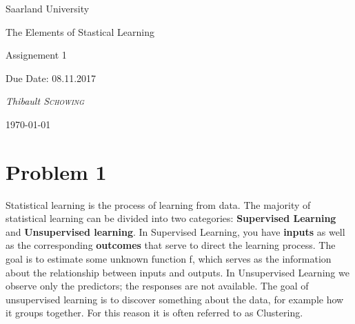 \documentclass[11pt,a4paper,twoside,openright]{report}
\author{Thibault Schowing}
\makeatletter
\newif\if@mainmatter \@mainmattertrue
\newcommand\mainmatter{%
	\cleardoublepage
	\@mainmattertrue
	\pagenumbering{arabic}}
\newcommand\blankpage{%
	\null
	\thispagestyle{empty}%
	\addtocounter{page}{-1}%
	\newpage}
\makeatother
\begin{document}
	
	\pagestyle{plain}%

	
	
	\begin{titlepage}
		\centering
		
		\small{Saarland University  \par}
		\huge{The Elements of Stastical Learning\par}
		\vspace{1cm}
		
		
		
		\vspace{1cm}
		\Large{Assignement 1\par}
		\vspace{1.5cm}
		\small{Due Date: 08.11.2017  \par}
		\vspace{1cm}
		
		
		
		\vspace{2cm}
		\small\textit{Thibault \textsc{Schowing}}\par
		
		\small{\today\par}
		
		\vfill
		
		
	\end{titlepage}
	\restoregeometry 
	
	
	\mainmatter
	
	
	\section*{Problem 1}
	
	Statistical learning is the process of learning from data. The majority of statistical learning can be divided into two categories: \textbf{Supervised Learning} and \textbf{Unsupervised learning}. In Supervised Learning, you have \textbf{inputs} as well as the corresponding \textbf{outcomes} that serve to direct the learning process. The goal is to estimate some unknown function f, which serves as the information about the relationship between inputs and outputs. In Unsupervised Learning we observe only the predictors; the responses are not available. The goal of unsupervised learning is to discover something about the data, for example how it groups together. For this reason it is often referred to as Clustering. \\
	
\end{document}

